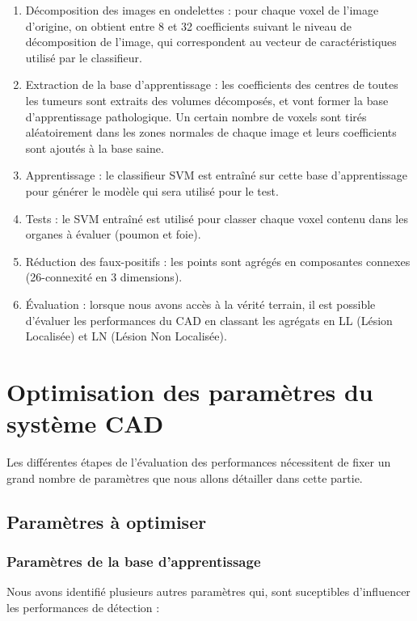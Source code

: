 \begin{enumerate}
 \item Décomposition des images en ondelettes : pour chaque voxel de l'image d'origine, on obtient entre 8 et 32 coefficients suivant le niveau de décomposition de l'image, qui correspondent au vecteur de caractéristiques utilisé par le classifieur.
 \item Extraction de la base d'apprentissage : les coefficients des centres de toutes les tumeurs sont extraits des volumes décomposés, et vont former la base d'apprentissage pathologique. Un certain nombre de voxels sont tirés aléatoirement dans les zones normales de chaque image et leurs coefficients sont ajoutés à la base saine.
 \item Apprentissage : le classifieur SVM est entraîné sur cette base d'apprentissage pour générer le modèle qui sera utilisé pour le test.
 \item Tests : le SVM entraîné est utilisé pour classer chaque voxel contenu dans les organes à évaluer (poumon et foie).
 \item Réduction des faux-positifs : les points sont agrégés en composantes connexes (26-connexité en 3 dimensions).
 \item Évaluation : lorsque nous avons accès à la vérité terrain, il est possible d'évaluer les performances du CAD en classant les agrégats en LL (Lésion Localisée) et LN (Lésion Non Localisée).
\end{enumerate}



\section{Optimisation des paramètres du système CAD} %
\label{lab:optim}

Les différentes étapes de l'évaluation des performances nécessitent de fixer un grand nombre de paramètres que nous allons détailler dans cette partie.

\subsection{Paramètres à optimiser} %
\label{lab:optimParametres}

\subsubsection{Paramètres de la base d'apprentissage}

Nous avons identifié plusieurs autres paramètres qui, sont suceptibles d'influencer les performances de détection :

